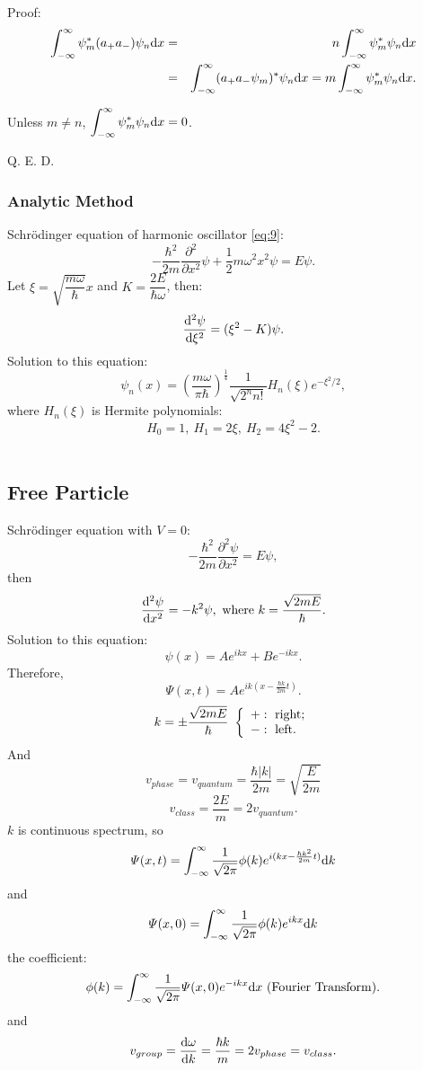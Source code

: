 \documentclass[12pt, 
]{article}
\begin{document}
\noindent Proof: 
\begin{eqnarray*}
	\int_{-\infty}^{\infty}\psi_m^*(a_+a_{-})\psi_n{\rm d}x&=&n\int_{-\infty}^{\infty}\psi_m^*\psi_n{\rm d}x\\
	&=&\int_{-\infty}^{\infty}(a_+a_{-}\psi_m)^*\psi_n{\rm d}x=m\int_{-\infty}^{\infty}\psi_m^*\psi_n{\rm d}x.
\end{eqnarray*}

Unless $m\neq n$, $\displaystyle\int_{-\infty}^{\infty}\psi_m^*\psi_n{\rm d}x=0$.

Q. E. D.
~\\

\subsubsection{Analytic Method}
Schr\"odinger equation of harmonic oscillator \eqref{eq:9}:
\[	
	-\frac{\hbar^2}{2m}\frac{\partial^2}{\partial x^2}\psi+\frac{1}{2}m\omega^2x^2\psi=E\psi.
\]
Let $\xi=\sqrt{\dfrac{m\omega}{\hbar}}x$ and $K=\dfrac{2E}{\hbar\omega}$, then:
\[
	\frac{{\rm d}^2\psi}{{\rm d}\xi^2}=(\xi^2-K)\psi.
\]
Solution to this equation:
\[
	\psi_n(x)=\left(\frac{m\omega}{\pi\hbar}\right)^\frac{1}{4}\frac{1}{\sqrt{2^n n!}}H_n(\xi)e^{-\xi^2 /2},
\]
where $H_n(\xi)$ is Hermite polynomials:
\[
	H_0=1,~H_1=2\xi,~H_2=4\xi^2-2.
\]
~\\

\subsection{Free Particle}
Schr\"odinger equation with $V=0$:
\[
	-\frac{\hbar^2}{2m}\frac{\partial^2\psi}{\partial x^2}=E\psi,
\]
then
\[
	\frac{{\rm d}^2\psi}{{\rm d}x^2}=-k^2\psi,~{\rm{where}}~k=\frac{\sqrt{2mE}}{\hbar}.
\]
Solution to this equation:
\[
	\psi(x)=Ae^{ikx}+Be^{-ikx}.
\]
Therefore,
\[
	\varPsi(x,t)=Ae^{ik(x-\frac{\hbar k}{2m}t)}.
\]
\[
	k=\pm\frac{\sqrt{2mE}}{\hbar}~\left\{
	\begin{array}{l}
		+:~{\rm right};\\
		-:~{\rm left}.
	\end{array}
	\right.
\]
And $$v_{phase}=v_{quantum}=\frac{\hbar|k|}{2m}=\sqrt{\frac{E}{2m}}$$
$$v_{class}=\frac{2E}{m}=2v_{quantum}.$$
$k$ is continuous spectrum, so
\[
	\varPsi(x,t)=\int_{-\infty}^{\infty}\frac{1}{\sqrt{2\pi}}\phi(k)e^{i(kx-\frac{\hbar k^2}{2m}t)}{{\rm d}}k
\]
and
\[
	\varPsi(x,0)=\int_{-\infty}^{\infty}\frac{1}{\sqrt{2\pi}}\phi(k)e^{ikx}{\rm d}k
\]
the coefficient:
\[
	\phi(k)=\int_{-\infty}^{\infty}\frac{1}{\sqrt{2\pi}}\varPsi(x,0)e^{-ikx}{\rm d}x~({\rm Fourier~Transform}).
\]
and
\[
	v_{group}=\frac{{\rm d}\omega}{{\rm d}k}=\frac{\hbar k}{m}=2v_{phase}=v_{class}.
\]
\end{document}
